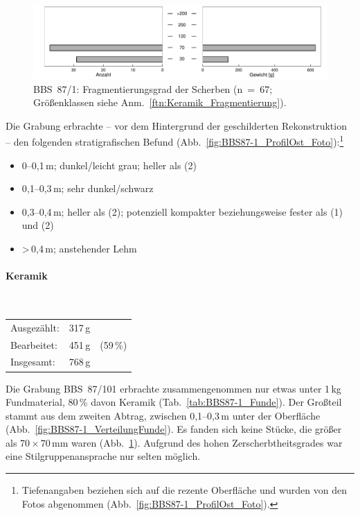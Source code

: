 \begin{figure}[tb]
	\centering
	\includegraphics[width=\textwidth]{fig/9-6_BBS87-1_Fragmentierung_2.pdf}
	\caption{BBS~87/1: Fragmentierungsgrad der Scherben (n~=~67; Größenklassen siehe Anm.~\ref{ftn:Keramik_Fragmentierung}).}
	\label{fig:Fragmenierung_BBS87-1}
\end{figure}

\vspace{.5em}\noindent Die Grabung erbrachte -- vor dem Hintergrund der geschilderten Rekonstruktion -- den folgenden stratigrafischen Befund (Abb.~\ref{fig:BBS87-1_ProfilOst_Foto}):\footnote{Tiefenangaben beziehen sich auf die rezente Oberfläche und wurden von den Fotos abgenommen (Abb.~\ref{fig:BBS87-1_ProfilOst_Foto}).}
\begin{itemize}[leftmargin=*, labelindent=1em, noitemsep, topsep=0pt]
\item [(1)] 0--0,1\,m; dunkel/leicht grau; heller als (2)
\item [(2)] 0,1--0,3\,m; sehr dunkel/schwarz
\item [(3)] 0,3--0,4\,m; heller als (2); potenziell kompakter beziehungsweise fester als (1) und (2)
\item [(4)] \textgreater\,0,4\,m; anstehender Lehm
\end{itemize}

\paragraph{Keramik\vspace{.5em}}\mbox{}\\
\begin{tabular}{@{}lrl@{}}
Ausgezählt: & 317\,g & \\ 
Bearbeitet: & 451\,g & (59\,\%) \\ 
Insgesamt: & 768\,g & \\ 
\end{tabular} 

\vspace{1em}\noindent Die Grabung BBS~87/101 erbrachte zusammengenommen nur etwas unter 1\,kg Fundmaterial, 80\,\% davon Keramik (Tab.~\ref{tab:BBS87-1_Funde}). Der Großteil stammt aus dem zweiten Abtrag, zwischen 0,1--0,3\,m unter der Oberfläche (Abb.~\ref{fig:BBS87-1_VerteilungFunde}). Es fanden sich keine Stücke, die größer als 70\,$\times$\,70\,mm waren (Abb.~\ref{fig:Fragmenierung_BBS87-1}). Aufgrund des hohen Zerscherbtheitsgrades war eine Stilgruppenansprache nur selten möglich. 


